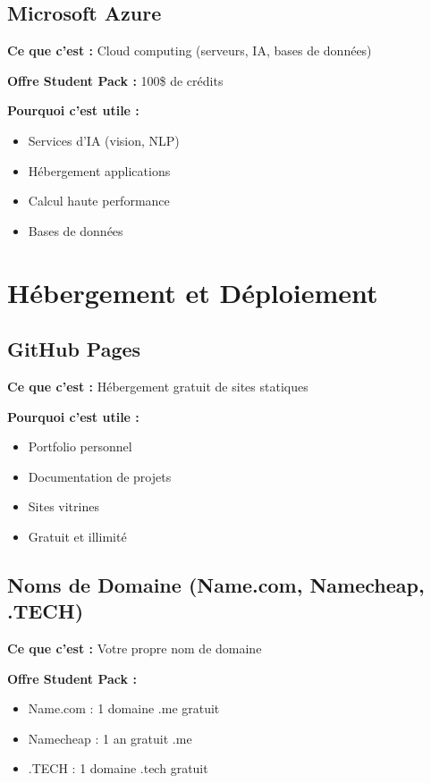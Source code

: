 \documentclass[11pt,a4paper]{article}
\begin{document}
\subsection{Microsoft Azure}

\textbf{Ce que c'est :} Cloud computing (serveurs, IA, bases de données)

\textbf{Offre Student Pack :} 100\$ de crédits

\textbf{Pourquoi c'est utile :}
\begin{itemize}
    \item Services d'IA (vision, NLP)
    \item Hébergement applications
    \item Calcul haute performance
    \item Bases de données
\end{itemize}

\newpage
\section{Hébergement et Déploiement}

\subsection{GitHub Pages}

\textbf{Ce que c'est :} Hébergement gratuit de sites statiques

\textbf{Pourquoi c'est utile :}
\begin{itemize}
    \item Portfolio personnel
    \item Documentation de projets
    \item Sites vitrines
    \item Gratuit et illimité
\end{itemize}

\subsection{Noms de Domaine (Name.com, Namecheap, .TECH)}

\textbf{Ce que c'est :} Votre propre nom de domaine

\textbf{Offre Student Pack :}
\begin{itemize}
    \item Name.com : 1 domaine .me gratuit
    \item Namecheap : 1 an gratuit .me
    \item .TECH : 1 domaine .tech gratuit
\end{itemize}
\end{document}
